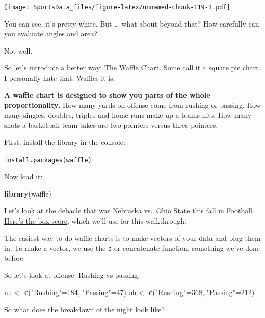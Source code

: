 \documentclass[]{book}
\newenvironment{Shaded}{\begin{snugshade}}{\end{snugshade}}
\newcommand{\DecValTok}[1]{\textcolor[rgb]{0.00,0.00,0.81}{#1}}
\newcommand{\KeywordTok}[1]{\textcolor[rgb]{0.13,0.29,0.53}{\textbf{#1}}}
\newcommand{\NormalTok}[1]{#1}
\newcommand{\StringTok}[1]{\textcolor[rgb]{0.31,0.60,0.02}{#1}}
\begin{document}
\texttt{[image: SportsData\_files/figure-latex/unnamed-chunk-119-1.pdf]}

You can see, it's pretty white. But \ldots{} what about beyond that? How carefully can you evaluate angles and area?

Not well.

So let's introduce a better way: The Waffle Chart. Some call it a square pie chart. I personally hate that. Waffles it is.

\textbf{A waffle chart is designed to show you parts of the whole -- proportionality}. How many yards on offense come from rushing or passing. How many singles, doubles, triples and home runs make up a teams hits. How many shots a basketball team takes are two pointers versus three pointers.

First, install the library in the console:

\texttt{install.packages(\textquotesingle{}waffle\textquotesingle{})}

Now load it:

\begin{Shaded}
\begin{Highlighting}[]
\KeywordTok{library}\NormalTok{(waffle)}
\end{Highlighting}
\end{Shaded}

Let's look at the debacle that was Nebraska vs.~Ohio State this fall in Football. \href{https://www.espn.com/college-football/matchup?gameId=401112241}{Here's the box score}, which we'll use for this walkthrough.

The easiest way to do waffle charts is to make vectors of your data and plug them in. To make a vector, we use the \texttt{c} or concatenate function, something we've done before.

So let's look at offense. Rushing vs passing.

\begin{Shaded}
\begin{Highlighting}[]
\NormalTok{nu <-}\StringTok{ }\KeywordTok{c}\NormalTok{(}\StringTok{"Rushing"}\NormalTok{=}\DecValTok{184}\NormalTok{, }\StringTok{"Passing"}\NormalTok{=}\DecValTok{47}\NormalTok{)}
\NormalTok{oh <-}\StringTok{ }\KeywordTok{c}\NormalTok{(}\StringTok{"Rushing"}\NormalTok{=}\DecValTok{368}\NormalTok{, }\StringTok{"Passing"}\NormalTok{=}\DecValTok{212}\NormalTok{)}
\end{Highlighting}
\end{Shaded}

So what does the breakdown of the night look like?
\end{document}
